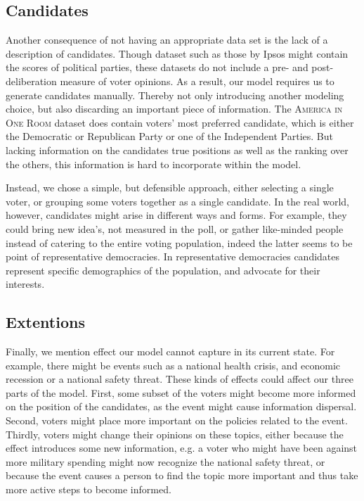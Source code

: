 \subsection{Candidates}

Another consequence of not having an appropriate data
set is the lack of a description of candidates. Though dataset such as those by
Ipsos might contain the scores of political parties, these datasets do not
include a pre- and post-deliberation measure of voter opinions. As a result,
our model requires us to generate candidates manually. Thereby not only
introducing another modeling choice, but also discarding an important piece of
information. The \textsc{America in One Room} dataset does contain voters' most
preferred candidate, which is either the Democratic or Republican Party or one
of the Independent Parties. But lacking information on the candidates true
positions as well as the ranking over the others, this information is hard to
incorporate within the model.

Instead, we chose a simple, but defensible approach, either selecting a single
voter, or grouping some voters together as a single candidate. In the real
world, however, candidates might arise in different ways and forms. For
example, they could bring new idea's, not measured in the poll, or gather
like-minded people instead of catering to the entire voting population, indeed
the latter seems to be point of representative democracies. In representative
democracies candidates represent specific demographics of the population, and
advocate for their interests.



\subsection{Extentions}

Finally, we mention effect our model cannot capture in its current state. For
example, there might be events such as a national health crisis, and economic
recession or a national safety threat. These kinds of effects could affect our
three parts of the model. First, some subset of the voters might become more
informed on the position of the candidates, as the event might cause
information dispersal. Second, voters might place more important on the
policies related to the event. Thirdly, voters might change their opinions on
these topics, either because the effect introduces some new information, e.g. a
voter who might have been against more military spending might now recognize
the national safety threat, or because the event causes a person to find the
topic more important and thus take more active steps to become informed.

